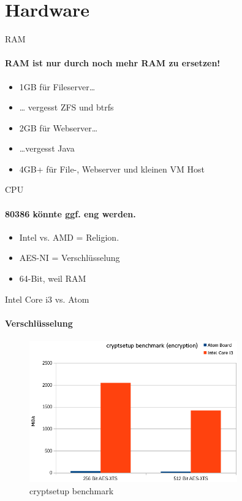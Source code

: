 \section{Hardware}

\begin{frame}{RAM}
\framesubtitle{RAM ist nur durch noch mehr RAM zu ersetzen!}
\begin{itemize}
\item 1GB für Fileserver…
\pause
\item … vergesst ZFS und btrfs
\pause
\item 2GB für Webserver…
\pause
\item …vergesst Java
\pause
\item 4GB+ für File-, Webserver und kleinen VM Host
\end{itemize}
\end{frame}

\begin{frame}{CPU}
\framesubtitle{80386 könnte ggf. eng werden.}
\begin{itemize}
\item Intel vs. AMD = Religion.
\pause
\item AES-NI = Verschlüsselung
\pause
\item 64-Bit, weil RAM
\end{itemize}
\end{frame}

\begin{frame}{Intel Core i3 vs. Atom}
\framesubtitle{Verschlüsselung}
\begin{figure}
\includegraphics[width=0.8\textwidth]{images/cryptsetup-benchmark.png}
\caption{cryptsetup benchmark}
\end{figure}
\end{frame}

